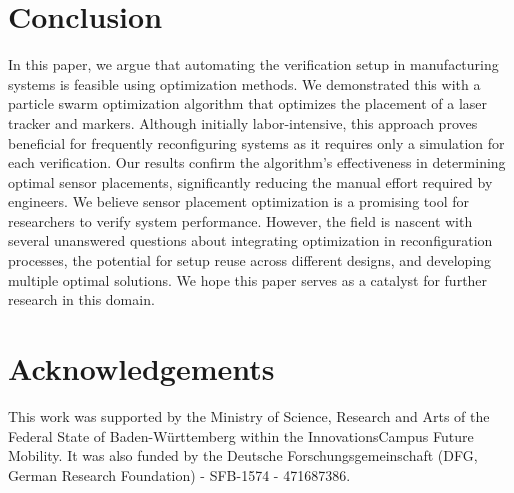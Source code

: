\documentclass{svproc}
\begin{document}
\section{Conclusion}
In this paper, we argue that automating the verification setup in manufacturing systems is feasible using optimization methods.
We demonstrated this with a particle swarm optimization algorithm that optimizes the placement of a laser tracker and markers.
Although initially labor-intensive, this approach proves beneficial for frequently reconfiguring systems as it requires only a simulation for each verification.
Our results confirm the algorithm's effectiveness in determining optimal sensor placements, significantly reducing the manual effort required by engineers.
We believe sensor placement optimization is a promising tool for researchers to verify system performance.
However, the field is nascent with several unanswered questions about integrating optimization in reconfiguration processes,
the potential for setup reuse across different designs, and developing multiple optimal solutions.
We hope this paper serves as a catalyst for further research in this domain.


\section{Acknowledgements}
This work was supported by the Ministry of Science, Research and Arts of the Federal State of Baden-Württemberg within the InnovationsCampus Future Mobility.
It was also funded by the Deutsche Forschungsgemeinschaft (DFG, German Research Foundation) - SFB-1574 - 471687386.
\printbibliography
\end{document}
